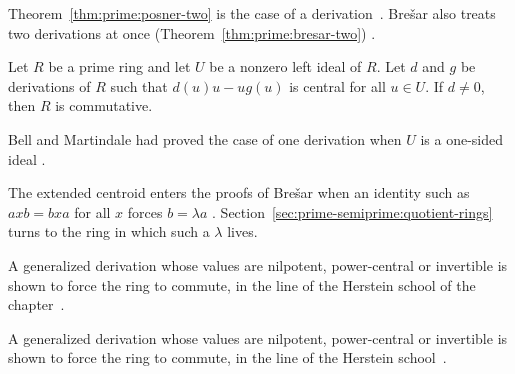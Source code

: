 Theorem~\ref{thm:prime:posner-two} is the case of a derivation~\cite[Theorem~B, p.~386]{Bresar1993}. Bre\v{s}ar
also treats two derivations at once (Theorem~\ref{thm:prime:bresar-two})
\cite[Theorem~B, p.~386]{Bresar1993}.

\begin{theorem}\label{thm:prime:bresar-two}
Let $R$ be a prime ring and let $U$ be a nonzero left ideal of $R$. Let $d$ and
$g$ be derivations of $R$ such that $d(u)u-ug(u)$ is central for all $u\in U$.
If $d\neq 0$, then $R$ is commutative.
\end{theorem}

Bell and Martindale had proved the case of one derivation when $U$ is a
one-sided ideal \cite[p.~386]{Bresar1993}.

The extended centroid enters the proofs of Bre\v{s}ar when an identity such as
$axb=bxa$ for all $x$ forces $b=\lambda a$ \cite[Remark~6,
p.~387]{Bresar1993}. Section~\ref{sec:prime-semiprime:quotient-rings} turns to
the ring in which such a $\lambda$ lives.

A generalized derivation whose values are nilpotent, power-central or
invertible is shown to force the ring to commute, in the line of the Herstein
school of the chapter~\cite{WlGeneralizedDerivationsWith2019}.

A generalized derivation whose values are nilpotent, power-central or
invertible is shown to force the ring to commute, in the line of the Herstein
school~\cite{WlGeneralizedDerivationsWithNilp2019}.
